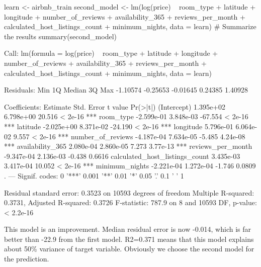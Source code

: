 \begin{Schunk}
\begin{Sinput}
learn <- airbnb_train %>% filter(price < quantile(airbnb_train$price, 0.9) & price > quantile(airbnb_train$price, 0.1)) %>% tidyr::drop_na()
second_model <- lm(log(price) ~ room_type + latitude + longitude 
                        + number_of_reviews + availability_365
                       + reviews_per_month + 
                     calculated_host_listings_count + minimum_nights, data = learn)
# Summarize the results
summary(second_model)
\end{Sinput}
\begin{Soutput}

Call:
lm(formula = log(price) ~ room_type + latitude + longitude + 
    number_of_reviews + availability_365 + reviews_per_month + 
    calculated_host_listings_count + minimum_nights, data = learn)

Residuals:
     Min       1Q   Median       3Q      Max 
-1.10574 -0.25653 -0.01645  0.24385  1.40928 

Coefficients:
                                 Estimate Std. Error t value Pr(>|t|)    
(Intercept)                     1.395e+02  6.798e+00  20.516  < 2e-16 ***
room_type                      -2.599e-01  3.848e-03 -67.554  < 2e-16 ***
latitude                       -2.025e+00  8.371e-02 -24.190  < 2e-16 ***
longitude                       5.796e-01  6.064e-02   9.557  < 2e-16 ***
number_of_reviews              -4.187e-04  7.634e-05  -5.485 4.24e-08 ***
availability_365                2.080e-04  2.860e-05   7.273 3.77e-13 ***
reviews_per_month              -9.347e-04  2.136e-03  -0.438   0.6616    
calculated_host_listings_count  3.435e-03  3.417e-04  10.052  < 2e-16 ***
minimum_nights                 -2.221e-04  1.272e-04  -1.746   0.0809 .  
---
Signif. codes:  0 '***' 0.001 '**' 0.01 '*' 0.05 '.' 0.1 ' ' 1

Residual standard error: 0.3523 on 10593 degrees of freedom
Multiple R-squared:  0.3731,    Adjusted R-squared:  0.3726 
F-statistic: 787.9 on 8 and 10593 DF,  p-value: < 2.2e-16
\end{Soutput}
\end{Schunk}

This model is an improvement. Median residual error is now -0.014, which
is far better than -22.9 from the first model. R2=0.371 means that this
model explains about 50\% variance of target variable. Obviously we
choose the second model for the prediction.

